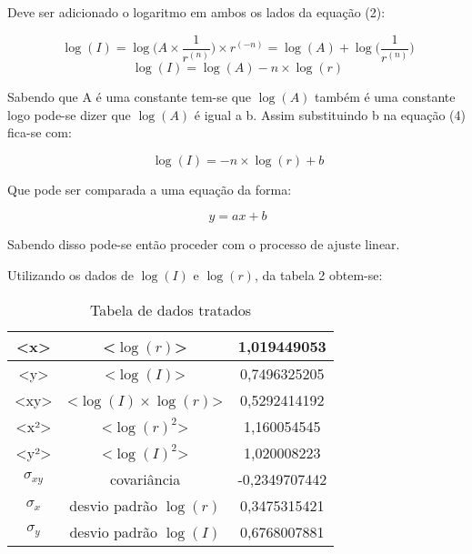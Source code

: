\documentclass [a4paper, 12pt]{article}
\begin{document}
Deve ser adicionado o logaritmo em ambos os lados da equação (2):

\begin{equation}
  \ \log (I) = \log \Bigg( {A \times \dfrac{1}{r^{(n)}} }\Bigg) \times {r^{(-n)}} = \log (A) + \log \Bigg( \dfrac{1}{r^{(n)}} \Bigg)
\end{equation}
\vspace{0.025 cm}
\begin{equation}
  \ \log (I) = \log (A) - n\times\log (r)
\end{equation}

Sabendo que A é uma constante tem-se que $\log(A)$ também é uma constante logo pode-se dizer que $\log(A)$ é igual a b. Assim substituindo b na equação (4) fica-se com:

\begin{equation}
  \ \log (I) = - n\times\log (r) + b
\end{equation}

Que pode ser comparada a uma equação da forma:

\begin{equation}
  \ y = ax + b
\end{equation}

Sabendo disso pode-se então proceder com o processo de ajuste linear.

Utilizando os dados de $\log(I)$ e $\log(r)$, da tabela 2 obtem-se:


\begin{table}[h!]
\centering
\caption{Tabela de dados tratados}
\vspace{0.5cm}
\begin{tabular}{|c|c|c|} \hline

<x>            &   <$\log(r)$>                   &  1,019449053     \\ \hline
<y>            &   <$\log(I)$>                   &  0,7496325205    \\ \hline
<xy>           &   <$\log(I)\times\log(r)$>      &  0,5292414192    \\ \hline
<x²>           &   <$\log(r)^2$>                 &  1,160054545     \\ \hline
<y²>           &   <$\log(I)^2$>                 &  1,020008223     \\ \hline
$\sigma_{xy}$  &    covariância                  &  -0,2349707442   \\ \hline
$\sigma_{x}$   &    desvio padrão $\log(r)$      & 0,3475315421    \\ \hline
$\sigma_{y}$   &    desvio padrão $\log(I)$      & 0,6768007881    \\ \hline
 

\end{tabular}
\end{table}
\end{document}
